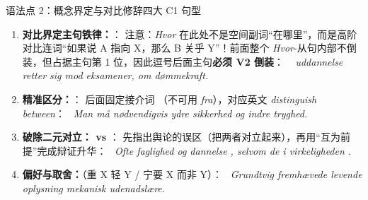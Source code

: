 \begin{grammatikbox}{语法点 2：概念界定与对比修辞四大 C1 句型}
\begin{enumerate}
  \item \textbf{对比界定主句铁律：}：\newline
    注意：\textit{Hvor} 在此处不是空间副词“在哪里”，而是高阶对比连词“如果说 A 指向 X，那么 B 关乎 Y”！前面整个 \textit{Hvor}-从句内部不倒装，但占据主句第 1 位，因此逗号后面主句\textbf{必须 V2 倒装}：\newline
    \ \textit{ uddannelse retter sig mod eksamener,  om dømmekraft.}
  \item \textbf{精准区分：}：\newline
    后面固定接介词 （不可用 \textit{fra}），对应英文 \textit{distinguish between}：\newline
    \ \textit{Man må nødvendigvis  ydre sikkerhed og indre tryghed.}
  \item \textbf{破除二元对立： vs }：\newline
    先指出舆论的误区（把两者对立起来），再用“互为前提”完成辩证升华：\newline
    \ \textit{Ofte  faglighed og dannelse , selvom de i virkeligheden .}
  \item \textbf{偏好与取舍：}（重 X 轻 Y / 宁要 X 而非 Y）：\newline
    \ \textit{Grundtvig fremhævede levende oplysning  mekanisk udenadslære.}
\end{enumerate}
\end{grammatikbox}

